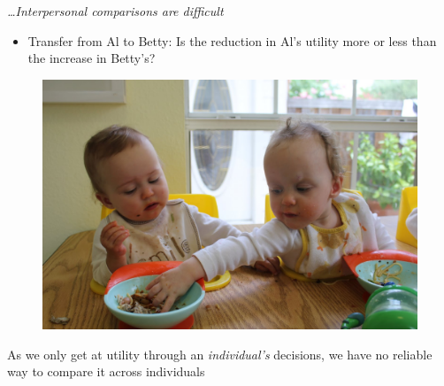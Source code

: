 \documentclass[table]{beamer}
\providecommand{\tightlist}{%
  \setlength{\itemsep}{0pt}\setlength{\parskip}{0pt}}
\begin{document}
\begin{frame}

\emph{\ldots Interpersonal comparisons are difficult}

\begin{itemize}
\tightlist
\item
  Transfer from Al to Betty: Is the reduction in Al's utility more or
  less than the increase in Betty's?
\end{itemize}

\begin{figure}

{\centering \includegraphics[width=0.9\linewidth]{picsfigs/babytakingfood} 

}

\end{figure}

As we only get at utility through an \emph{individual's} decisions, we
have no reliable way to compare it across individuals

\end{frame}
\end{document}
